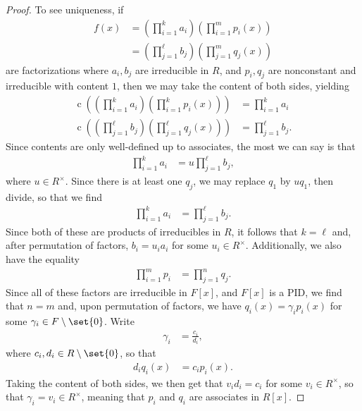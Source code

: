 \documentclass[10pt]{mypackage}
\begin{document}
\begin{proof}
  To see uniqueness, if
  \begin{align*}
    f(x) &= \left( \prod_{i=1}^{k}a_i \right)\left( \prod_{i=1}^{m}p_i(x) \right)\\
         &= \left( \prod_{j=1}^{\ell}b_j \right)\left( \prod_{j=1}^{m}q_j(x) \right)
  \end{align*}
  are factorizations where $a_i,b_j$ are irreducible in $R$, and $p_i,q_j$ are nonconstant and irreducible with content $1$, then we may take the content of both sides, yielding
  \begin{align*}
    \operatorname{c}\left( \left( \prod_{i=1}^{k}a_i \right)\left( \prod_{i=1}^{k}p_i(x) \right) \right) &= \prod_{i=1}^{k}a_i\\
    \operatorname{c}\left( \left( \prod_{j=1}^{\ell}b_j \right)\left( \prod_{j=1}^{\ell}q_j(x) \right) \right) &= \prod_{j=1}^{\ell}b_j.
  \end{align*}
  Since contents are only well-defined up to associates, the most we can say is that
  \begin{align*}
    \prod_{i=1}^{k}a_i &= u\prod_{j=1}^{\ell}b_j,
  \end{align*}
  where $u\in R^{\times}$. Since there is at least one $q_j$, we may replace $q_1$ by $uq_1$, then divide, so that we find
  \begin{align*}
    \prod_{i=1}^{k}a_i &= \prod_{j=1}^{\ell}b_j.
  \end{align*}
  Since both of these are products of irreducibles in $R$, it follows that $k = \ell$ and, after permutation of factors, $b_i = u_i a_i$ for some $u_i\in R^{\times}$. Additionally, we also have the equality
  \begin{align*}
    \prod_{i=1}^{m}p_i &= \prod_{j=1}^{n}q_j.
  \end{align*}
  Since all of these factors are irreducible in $F[x]$, and $F[x]$ is a PID, we find that $ n= m $ and, upon permutation of factors, we have $q_i(x) = \gamma_ip_i(x)$ for some $\gamma_i\in F\setminus \set{0}$. Write
  \begin{align*}
    \gamma_i &= \frac{c_i}{d_i},
  \end{align*}
  where $c_i,d_i\in R\setminus \set{0}$, so that
  \begin{align*}
    d_i q_i(x) &= c_ip_i(x).
  \end{align*}
  Taking the content of both sides, we then get that $v_id_i = c_i$ for some $v_i\in R^{\times}$, so that $\gamma_i = v_i\in R^{\times}$, meaning that $p_i$ and $q_i$ are associates in $R[x]$.
\end{proof}
\end{document}

